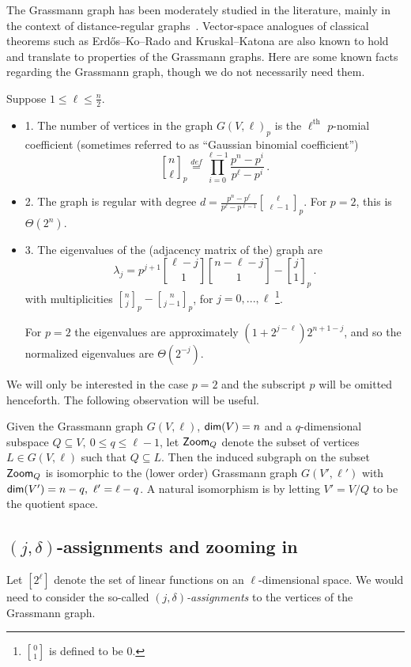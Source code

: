 \documentclass{toc}
\newcommand\defeq{\stackrel{def}{=}}
\renewcommand\leq{\leqslant}
\begin{document}
%
The Grassmann graph has been moderately studied in the literature, mainly in the context of distance-regular graphs~\cite{BCN12}.
%
%
Vector-space analogues of classical %
theorems such as
%
%
Erd\H{o}s--Ko--Rado and Kruskal--Katona %
are also known to hold~\cite{CP10}  %
and translate to properties of the Grassmann graphs.  %
Here are some
known facts regarding the Grassmann graph, though we do not necessarily need them.
\begin{fact}
Suppose $1 \leq \ell \leq \frac{n}{2}$.
\begin{itemize}
\item[] 1. The number of vertices in the graph $G(V, \ell)_p$  is the $\ell^{\mbox{th}}$ $p$-nomial coefficient (sometimes referred to as ``Gaussian binomial coefficient'')
\[
{n \brack \ell}_p \defeq \prod\limits_{i=0}^{\ell-1}{\frac{p^{n}-p^{i}}{p^{\ell}-p^{i}}}\,.%
\]
\item[] 2. The graph is regular with degree $d=\frac{p^n-p^\ell}{p^\ell-p^{\ell-1}}{\ell \brack \ell-1}_p$.  For $p=2$,  this is $\Theta(2^n)$.
\item[] 3. The eigenvalues of the (adjacency matrix of the) graph are
\[
\lambda_j = p^{j+1}{\ell-j \brack 1}{n-\ell-j \brack 1}  - {j \brack 1}_p\,.%
\]
with multiplicities ${n \brack j}_p - {n\brack j-1}_p$, for $j=0,...,\ell$ \footnote{${0 \brack 1}$  is defined to be $0$.}.

For $p=2$ the eigenvalues are approximately $(1+2^{j-\ell})2^{n+1-j}$, and so the normalized eigenvalues are $\Theta(2^{-j})$.
\end{itemize}
\end{fact}
We will only be interested in the case $p=2$ and the subscript $p$ will be omitted henceforth. The following observation will be useful.
\begin{fact}\label{fact:isomorphic}
Given the Grassmann graph $G(V,\ell)$,
${\sf dim}(V) = n$ and a $q$-dimensional subspace $Q \subseteq V, ~0 \leq q \leq \ell-1$, let ${\sf Zoom}_Q$ denote the subset
of vertices  $L \in G(V,\ell)$ such that $Q \subseteq L$. Then the induced subgraph on the subset ${\sf Zoom}_Q$ is isomorphic to
the (lower order) Grassmann graph $G(V',\ell')$ with ${\sf dim}(V')=n-q, ~\ell' = \ell- q$. A natural isomorphism is by letting
$V' = V/Q$ to be the quotient space.
\end{fact}

%
\subsection{\texorpdfstring{$(j,\delta)$}{(j,delta)}-assignments and zooming in}
Let $[2^\ell]$ denote the set of linear functions on an $\ell$-dimensional space. We would need to consider
the so-called \emph{$(j,\delta)$-assignments} %
%
to the vertices of the Grassmann graph.
\end{document}
